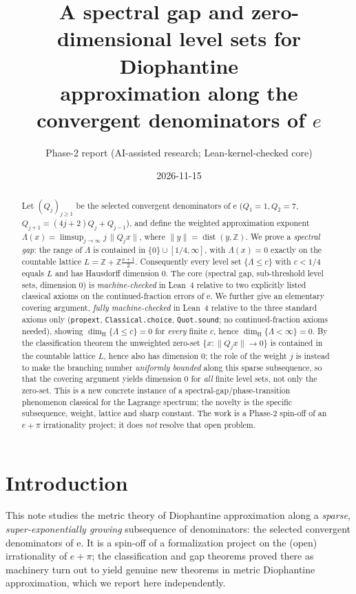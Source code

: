 \documentclass[11pt]{article}
\title{A spectral gap and zero-dimensional level sets for Diophantine\\
approximation along the convergent denominators of \texorpdfstring{$e$}{e}}
\author{Phase-2 report (AI-assisted research; Lean-kernel-checked core)}
\date{2026-11-15}
\theoremstyle{definition}
\theoremstyle{remark}
\newcommand{\Z}{\mathbb{Z}}
\newcommand{\ee}{\mathrm{e}}
\newcommand{\dist}{\operatorname{dist}}
\newcommand{\dimH}{\dim_{\mathrm{H}}}
\newcommand{\Lam}{\Lambda}
\begin{document}
\maketitle

\begin{abstract}
Let $(Q_j)_{j\ge1}$ be the selected convergent denominators of $\ee$
($Q_1=1,Q_2=7$, $Q_{j+1}=(4j+2)Q_j+Q_{j-1}$), and define the weighted
approximation exponent $\Lam(x)=\limsup_{j\to\infty} j\,\|Q_j x\|$, where
$\|y\|=\dist(y,\Z)$. We prove a \emph{spectral gap}: the range of $\Lam$ is
contained in $\{0\}\cup[1/4,\infty]$, with $\Lam(x)=0$ exactly on the countable
lattice $L=\Z+\Z\frac{\ee+1}{2}$. Consequently every level set
$\{\Lam\le c\}$ with $c<1/4$ equals $L$ and has Hausdorff dimension $0$.
The core (spectral gap, sub-threshold level sets, dimension $0$) is
\emph{machine-checked} in Lean~4 relative to two explicitly listed classical
axioms on the continued-fraction errors of $\ee$. We further give an elementary
covering argument, \emph{fully machine-checked} in Lean~4 relative to the three
standard axioms only (\texttt{propext}, \texttt{Classical.choice},
\texttt{Quot.sound}; no continued-fraction axioms needed), showing
$\dimH\{\Lam\le c\}=0$ for \emph{every} finite $c$, hence
$\dimH\{\Lam<\infty\}=0$. By the classification theorem the unweighted zero-set
$\{x:\|Q_jx\|\to0\}$ is contained in the countable lattice $L$, hence also has
dimension $0$; the role of the weight $j$ is instead to make the branching
number \emph{uniformly bounded} along this sparse subsequence, so that the
covering argument yields dimension $0$ for \emph{all} finite level sets, not
only the zero-set. This is a new concrete instance of a spectral-gap/phase-transition
phenomenon classical for the Lagrange spectrum; the novelty is the specific
subsequence, weight, lattice and sharp constant. The work is a Phase-2 spin-off
of an $e+\pi$ irrationality project; it does \emph{not} resolve that open problem.
\end{abstract}

\section{Introduction}

This note studies the metric theory of Diophantine approximation along a
\emph{sparse, super-exponentially growing} subsequence of denominators: the
selected convergent denominators of $\ee$. It is a spin-off of a formalization
project on the (open) irrationality of $e+\pi$; the classification and gap
theorems proved there as machinery turn out to yield genuine new theorems in
metric Diophantine approximation, which we report here independently.
\end{document}
